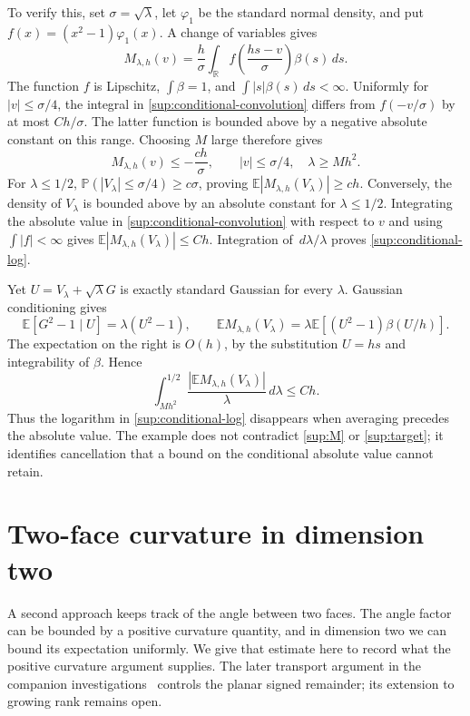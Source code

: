 \documentclass[11pt,a4paper]{article}
\theoremstyle{remark}
\newcommand{\E}{\mathbb E}
\newcommand{\Pp}{\mathbb P}
\newcommand{\R}{\mathbb R}
\newcommand{\dd}{\,d}
\begin{document}
To verify this, set \(\sigma=\sqrt\lambda\), let \(\varphi_1\)
be the standard normal density, and put
\(f(x)=(x^2-1)\varphi_1(x)\). A change of variables gives
\begin{equation}
 M_{\lambda,h}(v)
 =\frac h\sigma\int_\R
       f\left(\frac{hs-v}{\sigma}\right)\beta(s)\dd s.
 \label{sup:conditional-convolution}
\end{equation}
The function \(f\) is Lipschitz,
\(\int\beta=1\), and \(\int|s|\beta(s)\dd s<\infty\).
Uniformly for \(|v|\le\sigma/4\), the integral in
\eqref{sup:conditional-convolution} differs from \(f(-v/\sigma)\)
by at most \(Ch/\sigma\). The latter function is bounded above by
a negative absolute constant on this range. Choosing \(M\) large
therefore gives
\[
 M_{\lambda,h}(v)\le-\frac{ch}{\sigma},
 \qquad |v|\le\sigma/4,\quad \lambda\ge Mh^2.
\]
For \(\lambda\le1/2\),
\(\Pp(|V_\lambda|\le\sigma/4)\ge c\sigma\), proving
\(\E|M_{\lambda,h}(V_\lambda)|\ge ch\).
Conversely, the density of \(V_\lambda\) is bounded above by an
absolute constant for \(\lambda\le1/2\). Integrating the absolute
value in \eqref{sup:conditional-convolution} with respect to \(v\)
and using \(\int|f|<\infty\) gives
\(\E|M_{\lambda,h}(V_\lambda)|\le Ch\).
Integration of \(\dd\lambda/\lambda\) proves
\eqref{sup:conditional-log}.

Yet \(U=V_\lambda+\sqrt\lambda G\) is exactly standard Gaussian
for every \(\lambda\). Gaussian conditioning gives
\[
 \E[G^2-1\mid U]=\lambda(U^2-1),\qquad
 \E M_{\lambda,h}(V_\lambda)
 =\lambda\E[(U^2-1)\beta(U/h)].
\]
The expectation on the right is \(O(h)\), by the substitution
\(U=hs\) and integrability of \(\beta\). Hence
\begin{equation}
 \int_{Mh^2}^{1/2}
 \frac{|\E M_{\lambda,h}(V_\lambda)|}{\lambda}\dd\lambda
 \le Ch.
 \label{sup:signed-no-log}
\end{equation}
Thus the logarithm in \eqref{sup:conditional-log} disappears when
averaging precedes the absolute value. The example does not contradict
\eqref{sup:M} or \eqref{sup:target}; it identifies cancellation that a
bound on the conditional absolute value cannot retain.

\section{Two-face curvature in dimension two}
\label{sup:curvature}

A second approach keeps track of the angle between two faces. The
angle factor can be bounded by a positive curvature quantity, and in
dimension two we can bound its expectation uniformly. We give that
estimate here to record what the positive curvature argument supplies.
The later transport argument in the companion investigations~\cite{Cancellation}
controls the planar signed remainder; its extension to growing rank
remains open.
\end{document}

